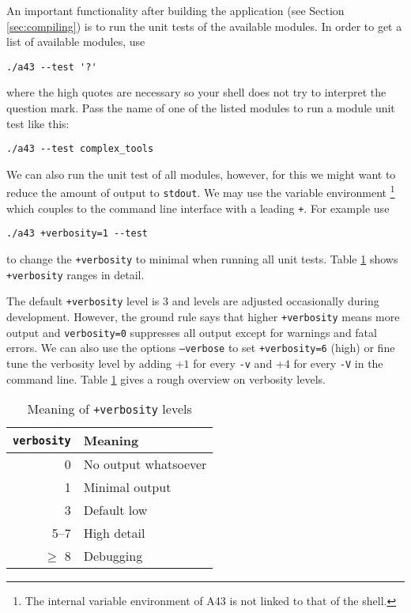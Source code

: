 \documentclass[oribibl]{llncs}
\newcommand{\ttt}[1]{\texttt{#1}}
\newcommand{\codename}{A43}
\begin{document}
\noindent
An important functionality after building the application (see Section \ref{sec:compiling})
is to run the unit tests of the available modules.
In order to get a list of available modules, use 
\begin{verbatim}
./a43 --test '?'
\end{verbatim}
where the high quotes are necessary so your shell does not try to interpret the question mark.
Pass the name of one of the listed modules to run a module unit test like this:
\begin{verbatim}
./a43 --test complex_tools
\end{verbatim}
We can also run the unit test of all modules, however, for this we might want to reduce
the amount of output to \ttt{stdout}.
We may use the variable environment 
\footnote{The internal variable environment of \codename{} is not linked to that of the shell.}
which couples to the command line interface with a leading \ttt{+}. For example use
\begin{verbatim}
./a43 +verbosity=1 --test
\end{verbatim}
to change the \ttt{+verbosity} to minimal when running all unit tests. Table \ref{tab:verbosity-level-meaning} shows \ttt{+verbosity} ranges in detail.


The default \ttt{+verbosity} level is $3$ and levels are adjusted occasionally during development.
However, the ground rule says that higher \ttt{+verbosity} means more output
and \ttt{verbosity=0} suppresses all output except for warnings and fatal errors.
We can also use the options \ttt{--verbose} to set \ttt{+verbosity=6} (high)
or fine tune the verbosity level by adding +$1$ for every \ttt{-v} and +$4$ for every \ttt{-V} in the command line.
Table \ref{tab:verbosity-level-meaning} gives a rough overview on verbosity levels. 

\begin{table}[ht!]
\caption[Meaning of verbosity levels]{
Meaning of \ttt{+verbosity} levels
} \label{tab:verbosity-level-meaning}
\centering
\begin{tabular}{|r|l|}
\hline
  \ttt{verbosity} & Meaning   \\
\hline
     0 & No output whatsoever \\
     1 & Minimal output       \\
     3 & Default low          \\
  5--7 & High detail          \\
   $\geq$ 8 & Debugging       \\
\hline
\end{tabular}
\end{table}
\end{document}
